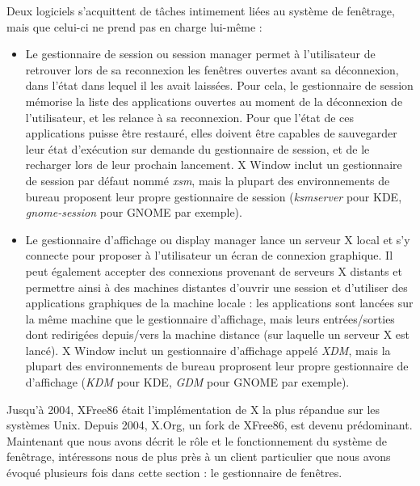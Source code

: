 Deux logiciels s'acquittent de tâches intimement liées au système de fenêtrage, mais que celui-ci ne prend pas en charge lui-même :
\begin{itemize} \vspace{1ex} \itemsep1ex
 \item Le gestionnaire de session ou session manager permet à l'utilisateur de retrouver lors de sa reconnexion les fenêtres ouvertes avant sa déconnexion, dans l'état dans lequel il les avait laissées. Pour cela, le gestionnaire de session mémorise la liste des applications ouvertes au moment de la déconnexion de l'utilisateur, et les relance à sa reconnexion. Pour que l'état de ces applications puisse être restauré, elles doivent être capables de sauvegarder leur état d'exécution sur demande du gestionnaire de session, et de le recharger lors de leur prochain lancement. X Window inclut un gestionnaire de session par défaut nommé \textit{xsm}, mais la plupart des environnements de bureau proposent leur propre gestionnaire de session (\textit{ksmserver} pour KDE, \textit{gnome-session} pour GNOME par exemple).
 \item Le gestionnaire d'affichage ou display manager lance un serveur X local et s'y connecte pour proposer à l'utilisateur un écran de connexion graphique. Il peut également accepter des connexions provenant de serveurs X distants et permettre ainsi à des machines distantes d'ouvrir une session et d'utiliser des applications graphiques de la machine locale : les applications sont lancées sur la même machine que le gestionnaire d'affichage, mais leurs entrées/sorties dont redirigées depuis/vers la machine distance (sur laquelle un serveur X est lancé). X Window inclut un gestionnaire d'affichage appelé \textit{XDM}, mais la plupart des environnements de bureau proprosent leur propre gestionnaire de d'affichage (\textit{KDM} pour KDE, \textit{GDM} pour GNOME par exemple).
\end{itemize}

\vspace{1em}

Jusqu'à 2004, XFree86 était l'implémentation de X la plus répandue sur les systèmes Unix. Depuis 2004, X.Org, un fork de XFree86, est devenu prédominant.\\

Maintenant que nous avons décrit le rôle et le fonctionnement du système de fenêtrage, intéressons nous de plus près à un client particulier que nous avons évoqué plusieurs fois dans cette section : le gestionnaire de fenêtres.